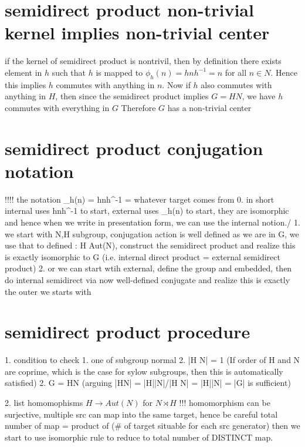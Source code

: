 \section*{semidirect product non-trivial kernel implies non-trivial center}
if the kernel of semidirect product is nontrivil, then by definition there exists element in $h$ such that $h$ is mapped to $\phi_h(n) = hnh^{-1} = n$ for all $n \in N$. 
Hence this implies $h$ commutes with anything in $n$. Now if $h$ also commutes with anything in $H$, then since the semidirect product implies $G = HN$, we have $h$ commutes with everything in $G$ 
Therefore $G$ has a non-trivial center


    
\section*{semidirect product conjugation notation}
!!!! the notation \phi_h(n) = hnh^{-1} = whatever target comes from 
    0. in short internal uses hnh^{-1} to start, external uses \phi_h(n) to start, they are isomorphic and hence when we write in presentation form, we can use the internal notion./
    1. we start with N,H subgroup, conjugation action is well defined as we are in G, we use that to defined \phi: H \to Aut(N), construct the semidirect product and realize this is exactly isomorphic to G (i.e. internal direct product = external semidirect product)
    2. or we can start wtih external, define the group and embedded, then do internal semidirect via now well-defined conjugate and realize this is exactly the outer we starts with
    
    
    
\section*{semidirect product procedure}

1. condition to check
    1. one of subgroup normal
    2. |H \cap N| = 1 (If order of H and N are coprime, which is the case for sylow subgroups, then this is automatically satisfied)
    2. G = HN (arguing |HN| = |H||N|/|H \cap N| = |H||N| = |G| is sufficient)
    
    
2. list homomophisms $H \to Aut(N)$ for $N \rtimes H$  
    !!! homomorphism can be surjective, multiple src can map into the same target, hence be careful
    total number of map = product of (# of target situable for each src generator)
    then we start to use isomorphic rule to reduce to total number of DISTINCT map.
        
